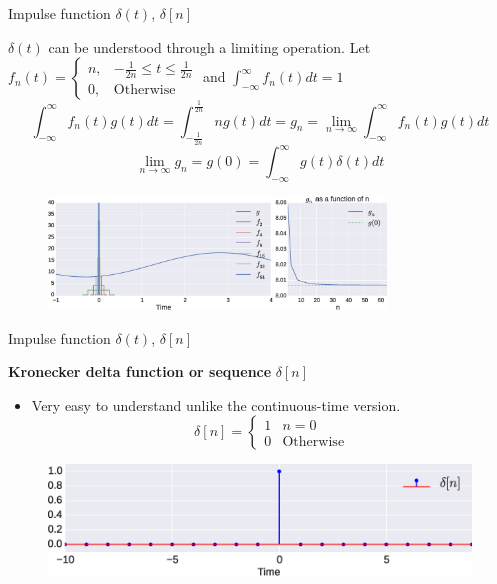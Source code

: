 \documentclass[aspectratio=169]{beamer}
\begin{document}
\begin{frame}{Impulse function $\delta(t)$, $\delta[n]$}
\begin{small}
$\delta(t)$ can be understood through a limiting operation. Let $f_{n}\left(t\right) = \begin{cases}
n, & -\frac{1}{2n} \leq t \leq \frac{1}{2n} \\
0, & \mathrm{Otherwise}
\end{cases}$ and $\int_{-\infty}^{\infty}f_n(t)dt = 1$
\[\int_{-\infty}^{\infty}f_{n}\left(t\right)g\left(t\right)dt = \int_{-\frac{1}{2n}}^{\frac{1}{2n}}ng\left(t\right)dt = g_n = \lim_{n\to\infty}\int_{-\infty}^{\infty}f_{n}\left(t\right)g\left(t\right)dt \]
\[\lim_{n\to\infty}g_{n} = g\left(0\right) = \int_{-\infty}^{\infty}g(t)\delta(t)dt\]
\end{small}
\vspace{-0.5cm}
\begin{figure}
\includegraphics[width=0.8\textwidth]{img/impulse_demo.eps}
\end{figure}
\end{frame}

\begin{frame}{Impulse function $\delta(t)$, $\delta[n]$}

\textbf{Kronecker delta function or sequence} $\delta[n]$

\begin{itemize}
\item Very easy to understand unlike the continuous-time version.
\[ \delta[n] = \begin{cases}
1 & n = 0 \\
0 & \mathrm{Otherwise}
\end{cases} \]
\end{itemize}

\begin{figure}
\includegraphics[width=\textwidth]{img/disc_imp.eps}
\end{figure}
\end{frame}
\end{document}
